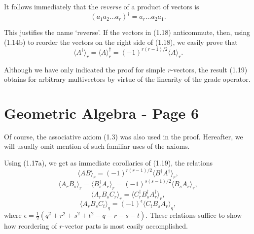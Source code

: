 \documentclass[fleqn]{scrartcl}
\numberwithin{equation}{section}
\begin{document}
\noindent It follows immediately that the \textit{reverse} of a product of vectors is
\begin{equation}
(a_1 a_2 \dots a_r)^{\dagger} = a_r \dots a_2 a_1. \tag{1.18}
\end{equation}

\noindent This justifies the name `reverse'.
If the vectors in (1.18) anticommute, then, using (1.14b) to reorder the vectors on the right side of (1.18), we easily prove that
\begin{equation}
\langle A^{\dagger} \rangle_r = \langle A \rangle_r^{\dagger} = (-1)^{r(r-1)/2} \langle A \rangle_r. \tag{1.19}
\end{equation}

\noindent Although we have only indicated the proof for simple \(r\)-vectors, the result (1.19) obtains for arbitrary multivectors by virtue of the linearity of the grade operator.

\section*{Geometric Algebra - Page 6}

\noindent Of course, the associative axiom (1.3) was also used in the proof. Hereafter, we will usually omit mention of such familiar uses of the axioms.

\vspace{1em}
\noindent Using (1.17a), we get as immediate corollaries of (1.19), the relations
\begin{equation}
\langle AB \rangle_r = (-1)^{r(r-1)/2} \langle B^{\dagger} A^{\dagger} \rangle_r, \tag{1.20a}
\end{equation}
\begin{equation}
\langle A_r B_s \rangle_r = \langle B_s^{\dagger} A_r \rangle_r = (-1)^{s(s-1)/2} \langle B_s A_r \rangle_r, \tag{1.20b}
\end{equation}
\begin{equation}
\langle A_r B_s C_r \rangle_r = \langle C_r^{\dagger} B_s^{\dagger} A_r^{\dagger} \rangle_r, \tag{1.20c}
\end{equation}
\begin{equation}
\langle A_r B_s C_t \rangle_q = (-1)^{\epsilon} \langle C_t B_s A_r \rangle_q, \tag{1.20d}
\end{equation}
where \(\epsilon = \frac{1}{2}(q^2 + r^2 + s^2 + t^2 - q - r - s - t)\). These relations suffice to show how reordering of \(r\)-vector parts is most easily accomplished.
\end{document}
